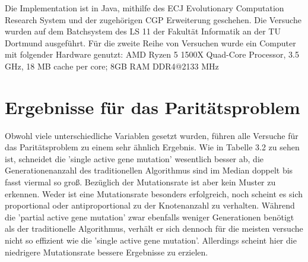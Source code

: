 Die Implementation ist in Java, mithilfe des ECJ Evolutionary Computation Research System und der zugehörigen CGP Erweiterung geschehen. Die Versuche wurden auf dem Batchsystem des LS 11 der Fakultät Informatik an der TU Dortmund ausgeführt. Für die zweite Reihe von Versuchen wurde ein Computer mit folgender Hardware genutzt:  AMD Ryzen 5 1500X Quad-Core Processor, 3.5 GHz, 18 MB cache per core; 8GB RAM DDR4@2133 MHz


\section{Ergebnisse für das Paritätsproblem}

Obwohl viele unterschiedliche Variablen gesetzt wurden, führen alle Versuche für das Paritätsproblem zu einem sehr ähnlich Ergebnis. Wie in Tabelle 3.2 zu sehen ist, schneidet die 'single active gene mutation' wesentlich besser ab, die Generationenanzahl des traditionellen Algorithmus sind im Median doppelt bis fasst viermal so groß. Bezüglich der Mutationsrate ist aber kein Muster zu erkennen. Weder ist eine Mutationsrate besonders erfolgreich, noch scheint es sich proportional oder antiproportional zu der Knotenanzahl zu verhalten. Während die 'partial active gene mutation' zwar ebenfalls weniger Generationen benötigt als der traditionelle Algorithmus, verhält er sich dennoch für die meisten versuche nicht so effizient wie die 'single active gene mutation'. Allerdings scheint hier die niedrigere Mutationsrate bessere Ergebnisse zu erzielen.




